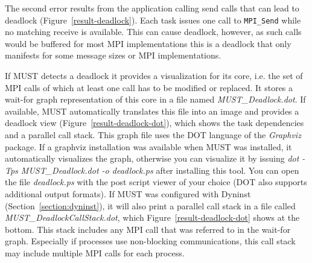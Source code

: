 \documentclass[english]{scrartcl}
\begin{document}

The second error results from the application calling send calls that can lead
to deadlock (Figure~\ref{result-deadlock}). Each task issues one call to
\texttt{MPI\_Send} while no matching receive is available. This can cause
deadlock, however, as such calls would be buffered for most MPI implementations this is a deadlock that only manifests
for some message sizes or MPI implementations. 
 

If MUST detects a deadlock it provides a visualization for its core, i.e. the
set of MPI calls of which at least one call has to be modified or replaced.
It stores a wait-for graph representation of this core in a file named
\emph{MUST\_Deadlock.dot}. 
If available, MUST automatically translates this file into an image and provides
a deadlock view (Figure~\ref{result-deadlock-dot}), which shows the task
dependencies and a parallel call stack.
This graph file uses the DOT language of the
\emph{Graphviz} package. 
If a graphviz installation was available when
MUST was installed, it automatically visualizes the
graph, otherwise you can visualize it by issuing \emph{dot -Tps
MUST\_Deadlock.dot -o deadlock.ps} after installing this tool.
You can open the file \emph{deadlock.ps} with the post
script viewer of your choice (DOT also supports additional output formats).
If MUST was
configured with Dyninst (Section~\ref{section:dyninst}), it will also print a
parallel call stack in a file called \emph{MUST\_DeadlockCallStack.dot}, which
Figure~\ref{result-deadlock-dot} shows at the bottom. This stack includes any
MPI call that was referred to in the wait-for graph. Especially if processes use
non-blocking communications, this call stack may include multiple MPI calls for
each process.
\end{document}
